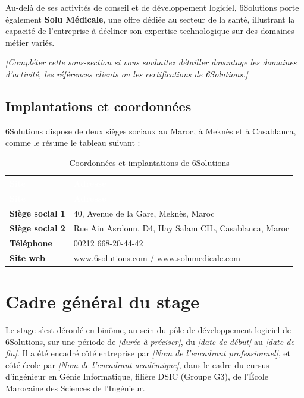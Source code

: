 \documentclass[12pt,a4paper]{report}
\newcommand{\placeholder}[1]{\par\smallskip\noindent\textcolor{placeholderred}{\itshape [#1]}\par\smallskip}
\begin{document}
Au-delà de ses activités de conseil et de développement logiciel, 6Solutions porte également \textbf{Solu Médicale}, une offre dédiée au secteur de la santé, illustrant la capacité de l'entreprise à décliner son expertise technologique sur des domaines métier variés.

\placeholder{Compléter cette sous-section si vous souhaitez détailler davantage les domaines d'activité, les références clients ou les certifications de 6Solutions.}

\subsection{Implantations et coordonnées}

6Solutions dispose de deux sièges sociaux au Maroc, à Meknès et à Casablanca, comme le résume le tableau suivant :

\begin{longtable}{@{}>{\raggedright\arraybackslash}p{}p{}@{}}
\caption{Coordonnées et implantations de 6Solutions}\\
\hline
\rowcolor{darkblue}\textcolor{white}{\textbf{Site}} & \textcolor{white}{\textbf{Adresse}} \\
\hline
\endfirsthead
\hline
\rowcolor{darkblue}\textcolor{white}{\textbf{Site}} & \textcolor{white}{\textbf{Adresse}} \\
\hline
\endhead
\hline
\endfoot
\textbf{Siège social 1} & 40, Avenue de la Gare, Meknès, Maroc \\
\hline
\textbf{Siège social 2} & Rue Ain Asrdoun, D4, Hay Salam CIL, Casablanca, Maroc \\
\hline
\textbf{Téléphone} & 00212 668-20-44-42 \\
\hline
\textbf{Site web} & www.6solutions.com  /  www.solumedicale.com \\
\hline
\end{longtable}

\section{Cadre général du stage}

Le stage s'est déroulé en binôme, au sein du pôle de développement logiciel de 6Solutions, sur une période de \textcolor{placeholderred}{\itshape [durée à préciser]}, du \textcolor{placeholderred}{\itshape [date de début]} au \textcolor{placeholderred}{\itshape [date de fin]}. Il a été encadré côté entreprise par \textcolor{placeholderred}{\itshape [Nom de l'encadrant professionnel]}, et côté école par \textcolor{placeholderred}{\itshape [Nom de l'encadrant académique]}, dans le cadre du cursus d'ingénieur en Génie Informatique, filière DSIC (Groupe G3), de l'École Marocaine des Sciences de l'Ingénieur.
\end{document}
